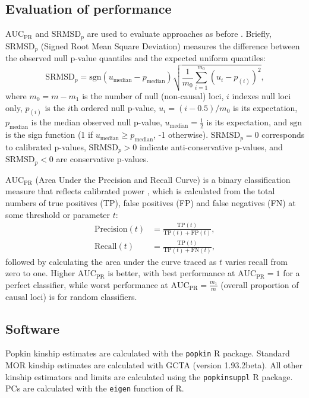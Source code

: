 \documentclass[11pt]{article}
\newcommand{\rmsd}{\text{SRMSD}_p}
\newcommand{\auc}{\text{AUC}_\text{PR}}
\begin{document}
\subsection{Evaluation of performance}

$\auc$ and $\rmsd$ are used to evaluate approaches as before \citep{yao_limitations_2022}.
Briefly, $\rmsd$ (Signed Root Mean Square Deviation) measures the difference between the observed null p-value quantiles and the expected uniform quantiles:
$$
\rmsd
=
\text{sgn}(u_\text{median} - p_\text{median} ) \sqrt{ \frac{1}{m_0} \sum_{i = 1}^{m_0} \left( u_i - p_{(i)} \right)^2 },
$$
where
$m_0 = m - m_1$ is the number of null (non-causal) loci,
$i$ indexes null loci only,
$p_{(i)}$ is the $i$th ordered null p-value,
$u_i = ( i - 0.5 ) / m_0$ is its expectation,
$p_\text{median}$ is the median observed null p-value,
$u_\text{median} = \frac{1}{2}$ is its expectation,
and $\text{sgn}$ is the sign function (1 if $u_\text{median} \ge p_\text{median}$, -1 otherwise).
$\rmsd = 0$ corresponds to calibrated p-values, $\rmsd > 0$ indicate anti-conservative p-values, and $\rmsd < 0$ are conservative p-values.

$\auc$ (Area Under the Precision and Recall Curve) is a binary classification measure that reflects calibrated power \citep{yao_limitations_2022}, which is calculated from the total numbers of true positives (TP), false positives (FP) and false negatives (FN) at some threshold or parameter $t$:
\begin{align*}
  \text{Precision}(t)
  &=
    \frac{ \text{TP}(t) }{ \text{TP}(t) + \text{FP}(t) }
    , \\
  \text{Recall}(t)
  &=
    \frac{ \text{TP}(t) }{ \text{TP}(t) + \text{FN}(t) }
    ,
\end{align*}
followed by calculating the area under the curve traced as $t$ varies recall from zero to one.
Higher $\auc$ is better, with best performance at $\auc = 1$ for a perfect classifier, while worst performance at $\auc = \frac{m_1}{m}$ (overall proportion of causal loci) is for random classifiers.



\subsection{Software}

Popkin kinship estimates are calculated with the \texttt{popkin} R package.
Standard MOR kinship estimates are calculated with GCTA (version 1.93.2beta).
All other kinship estimators and limits are calculated using the \texttt{popkinsuppl} R package.
PCs are calculated with the \texttt{eigen} function of R.
\end{document}

